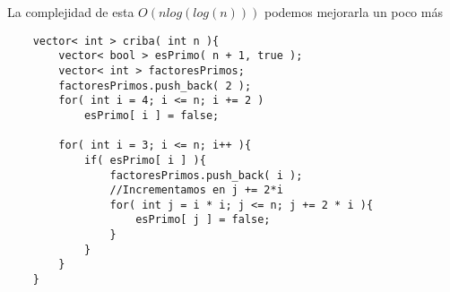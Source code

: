 La complejidad de esta $O( nlog(log(n)))$ podemos mejorarla un poco más 

\begin{lstlisting}
    vector< int > criba( int n ){
        vector< bool > esPrimo( n + 1, true );
        vector< int > factoresPrimos;
        factoresPrimos.push_back( 2 );
        for( int i = 4; i <= n; i += 2 )
            esPrimo[ i ] = false;
        
        for( int i = 3; i <= n; i++ ){
            if( esPrimo[ i ] ){
                factoresPrimos.push_back( i );
                //Incrementamos en j += 2*i
                for( int j = i * i; j <= n; j += 2 * i ){
                    esPrimo[ j ] = false;
                }
            }
        }
    }
\end{lstlisting}